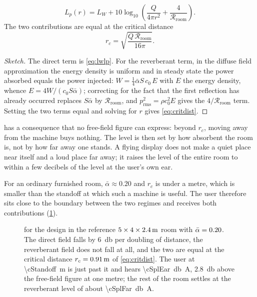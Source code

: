 \begin{proposition}
\label{prop:room}
\begin{equation}
  L_p(r) = L_W + 10\log_{10}\!\left(
    \frac{Q}{4\pi r^{2}} + \frac{4}{\mathcal{R}_{\mathrm{room}}}\right) .
  \label{eq:roomlevel}
\end{equation}
The two contributions are equal at the critical distance
\begin{equation}
  r_c = \sqrt{\frac{Q\,\mathcal{R}_{\mathrm{room}}}{16\pi}} .
  \label{eq:critdist}
\end{equation}
\end{proposition}

\begin{proof}[Sketch]
The direct term is \cref{eq:lwlp}. For the reverberant term, in the diffuse
field approximation the energy density is uniform and in steady state the power
absorbed equals the power injected: $W = \tfrac14 \bar\alpha S\, c_0\, E$ with
$E$ the energy density, whence $E = 4W/(c_0 S\bar\alpha)$; correcting for the
fact that the first reflection has already occurred replaces $S\bar\alpha$ by
$\mathcal{R}_{\mathrm{room}}$, and $p_{\mathrm{rms}}^2 = \rho c_0^2 E$ gives the $4/\mathcal{R}_{\mathrm{room}}$
term. Setting the two terms equal and solving for $r$ gives
\cref{eq:critdist}.
\end{proof}

\begin{finding}
 has a consequence that no free-field figure can express:
beyond $r_c$, moving away from the machine buys nothing. The level is then set
by how absorbent the room is, not by how far away one stands. A flying display
does not make a quiet place near itself and a loud place far away; it raises
the level of the entire room to within a few decibels of the level at the user's
own ear.
\end{finding}

For an ordinary furnished room, $\bar\alpha\approx0.20$ and $r_c$ is under a
metre, which is smaller than the standoff at which such a machine is useful.
The user therefore sits close to the boundary between the two regimes and
receives both contributions (\cref{fig:room}).

\begin{figure}[tbp]
\centering

\caption{ for the design in the reference
$5\times4\times\SI{2.4}{\metre}$ room with
$\bar\alpha=0.20$. The direct field falls by \SI{6}{\decibel} per
doubling of distance, the reverberant field does not fall at all, and the two
are equal at the critical distance $r_c=\SI{0.91}{\metre}$ of
\cref{eq:critdist}. The user at \SI{\cStandoff}{\metre} is just past it and
hears \SI{\cSplEar}{\decibel A}, \SI{2.8}{\decibel} above the free-field figure
at one metre; the rest of the room settles at the reverberant level of about
\SI{\cSplFar}{\decibel A}.}
\label{fig:room}
\end{figure}

